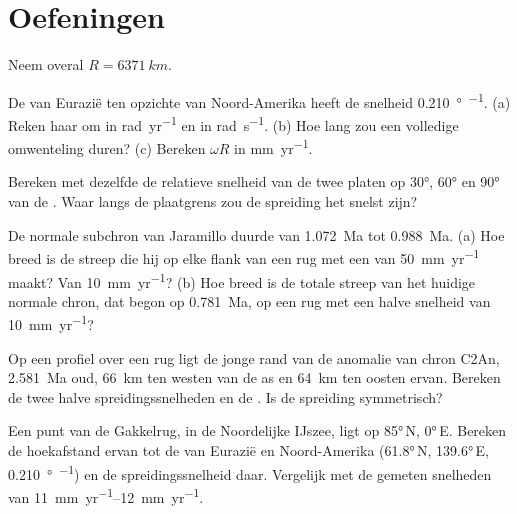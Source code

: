 \section{Oefeningen}

Neem overal $R = \qty{6371}{km}$.

\begin{exercise}[$\star$]\label{exo:b1:plate-kinematics:1}
De  van Eurazië ten opzichte van Noord-Amerika heeft de snelheid \qty{0.210}{\degree\per\Myr}. (a) Reken haar om in \unit{rad.yr^{-1}} en in \unit{rad.s^{-1}}. (b) Hoe lang zou een volledige omwenteling duren? (c) Bereken $\omega R$ in \unit{mm.yr^{-1}}.
\end{exercise}

\begin{exercise}[$\star$]\label{exo:b1:plate-kinematics:2}
Bereken met dezelfde  de relatieve snelheid van de twee platen op \ang{30}, \ang{60} en \ang{90} van de . Waar langs de plaatgrens zou de spreiding het snelst zijn?
\end{exercise}

\begin{exercise}[$\star$]\label{exo:b1:plate-kinematics:3}
De normale subchron van Jaramillo duurde van \qty{1.072}{Ma} tot \qty{0.988}{Ma}. (a) Hoe breed is de streep die hij op elke flank van een rug met een  van \qty{50}{mm.yr^{-1}} maakt? Van \qty{10}{mm.yr^{-1}}? (b) Hoe breed is de totale streep van het huidige normale chron, dat begon op \qty{0.781}{Ma}, op een rug met een halve snelheid van \qty{10}{mm.yr^{-1}}?
\end{exercise}

\begin{exercise}[$\star$]\label{exo:b1:plate-kinematics:4}
Op een profiel over een rug ligt de jonge rand van de anomalie van chron C2An, \qty{2.581}{Ma} oud, \qty{66}{km} ten westen van de as en \qty{64}{km} ten oosten ervan. Bereken de twee halve spreidingssnelheden en de . Is de spreiding symmetrisch?
\end{exercise}

\begin{exercise}[$\star\star$]\label{exo:b1:plate-kinematics:5}
Een punt van de Gakkelrug, in de Noordelijke IJszee, ligt op \ang{85}\,N, \ang{0}\,E. Bereken de hoekafstand ervan tot de  van Eurazië en Noord-Amerika (\ang{61.8}\,N, \ang{139.6}\,E, \qty{0.210}{\degree\per\Myr}) en de spreidingssnelheid daar. Vergelijk met de gemeten snelheden van \qtyrange{11}{12}{mm.yr^{-1}}.
\end{exercise}

